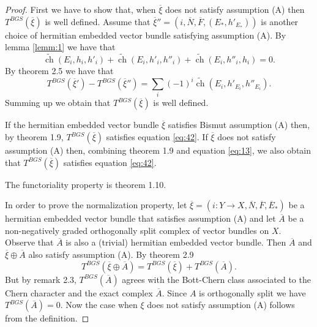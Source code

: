 \documentclass[10pt,twoside]{article}
\numberwithin{equation}{section}
\theoremstyle{plain}
\theoremstyle{definition}
\DeclareMathOperator{\ch}{ch}
\begin{document}
\begin{proof}
  First we have to show that, when $\overline {\xi}$ does not satisfy
  assumption (A) then $T^{BGS}(\overline {\xi})$ is well
  defined. Assume that $\overline {\xi}''=(i,\overline N,\overline 
  F, (E_{\ast},h'_{E_{\ast}}))$ is another choice of hermitian
  embedded vector bundle satisfying assumption (A). By lemma
  \ref{lemm:1} we have that
  \begin{displaymath}
    \widetilde{\ch}(E_{i},h_{i},h'_{i})+
    \widetilde{\ch}(E_{i},h'_{i},h''_{i})  
    +\widetilde{\ch}(E_{i},h''_{i},h_{i})=0.
  \end{displaymath}
  By \cite{BismutGilletSoule:MR1086887} theorem 2.5 we have that
  \begin{displaymath}
    T^{BGS}(\overline{\xi}')-T^{BGS}(\overline{\xi}'')
    =\sum_{i}(-1)^{i}\widetilde
    {\ch}(E_{i},h'_{E_{i}},h''_{E_{i}}).  
  \end{displaymath}
  Summing up we obtain that $T^{BGS}(\overline {\xi})$ is well
  defined. 

  If the hermitian embedded vector bundle $\overline {\xi}$ satisfies
  Bismut assumption 
  (A) then, by \cite{BismutGilletSoule:MR1086887} theorem 1.9,
  $T^{BGS}(\overline 
  {\xi})$ satisfies 
  equation \eqref{eq:42}. If $\overline {\xi}$ does not satisfy
  assumption (A) then, combining \cite{BismutGilletSoule:MR1086887}
  theorem 1.9 and 
  equation \eqref{eq:13}, we also obtain that $T^{BGS}(\overline
  {\xi})$ satisfies 
  equation \eqref{eq:42}. 

  The functoriality property is \cite{BismutGilletSoule:MR1086887}
  theorem 1.10.  

  In order to prove the normalization property, let $\overline
  {\xi}=(i\colon Y\longrightarrow  
    X,\overline N, \overline 
    F, \overline E_{\ast})$
  be a hermitian embedded vector bundle that satisfies assumption (A)
  and let $\overline A$ be a non-negatively graded orthogonally split
  complex of vector bundles on $X$. Observe that $\overline A$ is also a
  (trivial) hermitian embedded vector bundle. Then $\overline A$ and
  $\overline {\xi}\oplus \overline A$ also satisfy assumption (A). By 
  \cite{BismutGilletSoule:MR1086887} theorem 2.9
  \begin{displaymath}
    T^{BGS}(\overline {\xi}\oplus \overline A)=
    T^{BGS}(\overline {\xi})+T^{BGS}(\overline A).
  \end{displaymath}
  But by \cite{BismutGilletSoule:MR1047123} remark 2.3, $T^{BGS}(\overline
  A)$ agrees with the 
  Bott-Chern class associated to the Chern character and  the exact
  complex $\overline A$. Since $A$ is 
  orthogonally split we have $T^{BGS}(\overline A)=0$. Now the case when $\xi$
  does not satisfy assumption (A) follows from the definition.


\end{proof}
\end{document}
